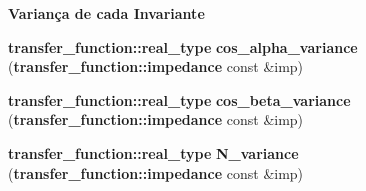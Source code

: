 \begin{Indent}{\bf Variança de cada Invariante}
\begin{CompactItemize}
\item 
{\bf transfer\_\-function::real\_\-type} \textbf{cos\_\-alpha\_\-variance} ({\bf transfer\_\-function::impedance} const \&imp)\label{namespaceerro__manual_1_1base__xi__eta_1_1wal__invariant_04e45faaed0f16cb63d625fcf428ec4a}

\item 
{\bf transfer\_\-function::real\_\-type} \textbf{cos\_\-beta\_\-variance} ({\bf transfer\_\-function::impedance} const \&imp)\label{namespaceerro__manual_1_1base__xi__eta_1_1wal__invariant_882b846ebcb73a1a4276d04d984f4594}

\item 
{\bf transfer\_\-function::real\_\-type} \textbf{N\_\-variance} ({\bf transfer\_\-function::impedance} const \&imp)\label{namespaceerro__manual_1_1base__xi__eta_1_1wal__invariant_e54899e982e959ea92bc1d022902a487}

\end{CompactItemize}
\end{Indent}
